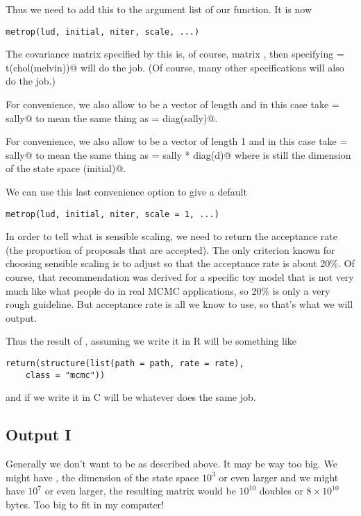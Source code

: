 \documentclass{article}
\begin{document}
Thus we need to add this to the argument list of our function.
It is now
\begin{verbatim}
metrop(lud, initial, niter, scale, ...)
\end{verbatim}

The covariance matrix specified by this is, of course,
\verb@scale %*% t(scale)@.  If you want the proposal to have covariance
matrix \verb@melvin@, then specifying
\verb@scale = t(chol(melvin))@ will do the job.
(Of course, many other specifications will also do the job.)

For convenience, we also allow \verb@scale@ to be a vector of
length \verb@d@ and in this case take \verb@scale = sally@
to mean the same thing as \verb@scale = diag(sally)@.

For convenience, we also allow \verb@scale@ to be a vector of
length 1 and in this case take \verb@scale = sally@
to mean the same thing as \verb@scale = sally * diag(d)@
where \verb@d@ is still the dimension of the state space
\verb@length(initial)@.

We can use this last convenience option to give \verb@scale@ a default
\begin{verbatim}
metrop(lud, initial, niter, scale = 1, ...)
\end{verbatim}

In order to tell what is sensible scaling, we need to return the
acceptance rate (the proportion of proposals that are accepted).
The only criterion known for choosing sensible scaling is to adjust
so that the acceptance rate is about 20\%.  Of course, that recommendation
was derived for a specific toy model that is not very much like what
people do in real MCMC applications, so 20\% is only a very rough guideline.
But acceptance rate is all we know to use, so that's what we will output.

Thus the result of \verb@metrop@, assuming we write it in R will be
something like
\begin{verbatim}
return(structure(list(path = path, rate = rate),
    class = "mcmc"))
\end{verbatim}
and if we write it in C will be whatever does the same job.

\subsection{Output I}

Generally we don't want \verb@path@ to be as described above.
It may be way too big.  We might have \verb@d@, the dimension of the
state space $10^3$ or even larger and we might have \verb@niter@
$10^7$ or even larger, the resulting \verb@path@ matrix would
be $10^{10}$ doubles or $8 \times 10^{10}$ bytes.  Too big to fit in
my computer!
\end{document}
